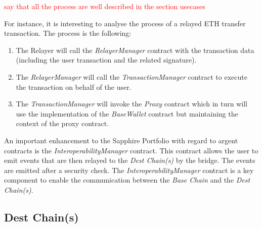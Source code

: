 \textcolor{red}{say that all the process are well described in the section usecases}


For instance, it is interesting to analyse the process of a relayed ETH transfer transaction. The process is the following:
\begin{enumerate}
    \item The Relayer will call the \textit{RelayerManager} contract with the transaction data (including the user transaction and the related signature).
    \item The \textit{RelayerManager} will call the \textit{TransactionManager} contract to execute the transaction on behalf of the user.
    \item The \textit{TransactionManager} will invoke the \textit{Proxy} contract which in turn will use the implementation of the \textit{BaseWallet} contract but maintaining the context of the proxy contract.
\end{enumerate}


An important enhancement to the Sapphire Portfolio with regard to argent contracts is the \textit{InteroperabilityManager} contract. This contract allows the user to emit events that are then relayed to the \textit{Dest Chain(s)} by the bridge. The events are emitted after a security check. The \textit{InteroperabilityManager} contract is a key component to enable the communication between the \textit{Base Chain} and the \textit{Dest Chain(s)}.

\subsection{Dest Chain(s)}
\label{subsec:dest_chain(s)} 
